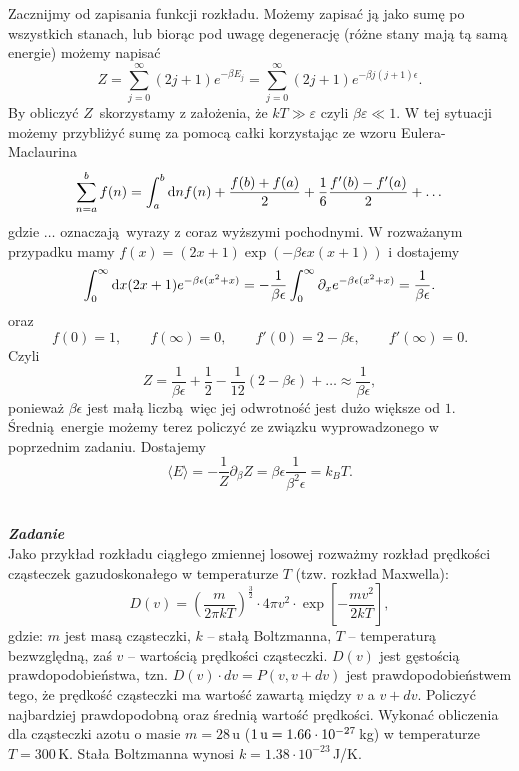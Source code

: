 \documentclass[11pt,a4paper]{article}
\newcounter{zadanie}\newcommand{\zadanie}[1][]{\addtocounter{zadanie}{1} ~\\  {\bf \emph{Zadanie \arabic{zadanie} #1 }} \\}
\begin{document}
Zacznijmy od zapisania funkcji rozkładu. Możemy zapisać ją jako sumę po wszystkich stanach, lub biorąc pod uwagę degenerację (różne stany mają tą samą energie) możemy napisać
\begin{equation}
	Z = \sum_{j=0}^{\infty} (2j+1) e^{-\beta E_j} = \sum_{j=0}^{\infty} (2j+1) e^{-\beta j(j+1) \epsilon}.
\end{equation}
By obliczyć $Z$ skorzystamy z założenia, że $kT \gg \varepsilon$ czyli $\beta \varepsilon \ll 1$. W tej sytuacji możemy przybliżyć sumę za pomocą całki korzystając ze wzoru Eulera-Maclaurina
\begin{equation}
	\sum_{n=a}^b f(n) = \int_{a}^b {\rm d}n f(n) + \frac{f(b) + f(a)}{2} + \frac{1}{6} \frac{f'(b) - f'(a)}{2} + \dots
\end{equation}
gdzie $\dots$ oznaczają wyrazy z coraz wyższymi pochodnymi. W rozważanym przypadku mamy $f(x) = (2x+1) \exp(-\beta \epsilon x(x+1))$ i dostajemy
\begin{equation}
	\int_0^{\infty} {\rm d}x (2x +1) e^{- \beta \epsilon (x^2+x)} = - \frac{1}{\beta \epsilon} \int_{0}^{\infty} \partial_x e^{-\beta \epsilon (x^2+x)} = \frac{1}{\beta \epsilon}.
\end{equation}
oraz
\begin{equation}
	f(0) = 1, \qquad f(\infty) = 0, \qquad f'(0) = 2 - \beta \epsilon, \qquad f'(\infty) = 0.
\end{equation}
Czyli
\begin{equation}
	Z = \frac{1}{\beta \epsilon} + \frac{1}{2} - \frac{1}{12}(2 - \beta \epsilon) + \dots \approx \frac{1}{\beta \epsilon},
\end{equation}
ponieważ $\beta \epsilon$ jest małą liczbą więc jej odwrotność jest dużo większe od $1$. Średnią energie możemy terez policzyć ze związku wyprowadzonego w poprzednim zadaniu. Dostajemy
\begin{equation}
	\langle E \rangle = - \frac{1}{Z} \partial_{\beta} Z = \beta \epsilon \frac{1}{\beta^2\epsilon} = k_B T.
\end{equation}

\newpage

\zadanie
Jako przykład rozkładu ciągłego zmiennej losowej rozważmy
rozkład prędkości cząsteczek gazu\linebreak doskonałego w temperaturze $T$
(tzw. rozkład Maxwella):
\[ D(v) = \left(\frac{m}{2\pi k T}\right)^{\frac{3}{2}}
          \cdot 4 \pi v^2 \cdot\exp\left[ -\frac{m v^2}{2 k T} \right],\]
gdzie: $m$ jest masą cząsteczki, $k$ – stałą Boltzmanna, $T$ – temperaturą bezwzględną, zaś $v$ – wartością prędkości cząsteczki.
$D(v)$ jest gęstością prawdopodobieństwa, tzn. $D(v)\cdot dv = P(v, v+dv)$ jest prawdopodobieństwem tego, że prędkość cząsteczki ma wartość zawartą między
$v$ a $v+dv$. Policzyć najbardziej prawdopodobną oraz średnią wartość prędkości. Wykonać obliczenia dla cząsteczki azotu o masie $m = 28\,$u ($1\,{\rm u} = 1.66\cdot 10^{-27}\,$kg) w temperaturze $T = 300\,$K.
Stała Boltzmanna wynosi $k = 1.38\cdot 10^{-23}\,$J/K.
\newline
\end{document}
